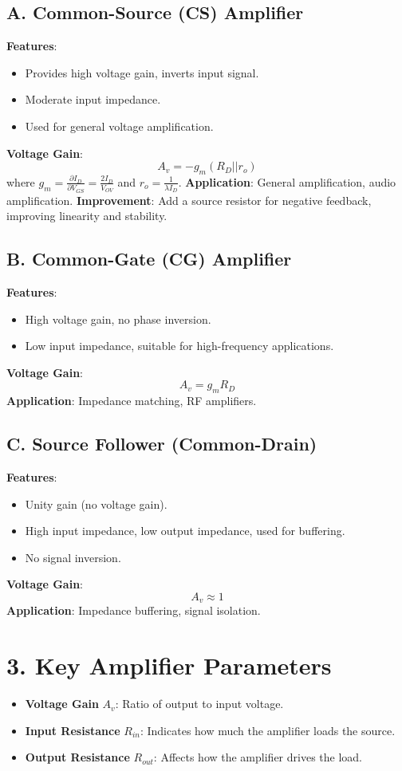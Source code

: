 \documentclass[10pt]{article}
\begin{document}
\begin{multicols}{2}
\subsection*{A. Common-Source (CS) Amplifier}
\textbf{Features}:
\begin{itemize}[noitemsep]
    \item Provides high voltage gain, inverts input signal.
    \item Moderate input impedance.
    \item Used for general voltage amplification.
\end{itemize}
\textbf{Voltage Gain}:
\[
A_v = -g_m (R_D || r_o)
\]
where \(g_m = \frac{\partial I_D}{\partial V_{GS}} = \frac{2 I_D}{V_{OV}}\) and \(r_o = \frac{1}{\lambda I_D}\).  
\textbf{Application}: General amplification, audio amplification.  
\textbf{Improvement}: Add a source resistor for negative feedback, improving linearity and stability.

\subsection*{B. Common-Gate (CG) Amplifier}
\textbf{Features}:
\begin{itemize}[noitemsep]
    \item High voltage gain, no phase inversion.
    \item Low input impedance, suitable for high-frequency applications.
\end{itemize}
\textbf{Voltage Gain}:
\[
A_v = g_m R_D
\]
\textbf{Application}: Impedance matching, RF amplifiers.

\subsection*{C. Source Follower (Common-Drain)}
\textbf{Features}:
\begin{itemize}[noitemsep]
    \item Unity gain (no voltage gain).
    \item High input impedance, low output impedance, used for buffering.
    \item No signal inversion.
\end{itemize}
\textbf{Voltage Gain}:
\[
A_v \approx 1
\]
\textbf{Application}: Impedance buffering, signal isolation.

\section*{3. Key Amplifier Parameters}
\begin{itemize}[noitemsep]
    \item \textbf{Voltage Gain} \(A_v\): Ratio of output to input voltage.
    \item \textbf{Input Resistance} \(R_{in}\): Indicates how much the amplifier loads the source.
    \item \textbf{Output Resistance} \(R_{out}\): Affects how the amplifier drives the load.
\end{itemize}


\end{multicols}
\end{document}
